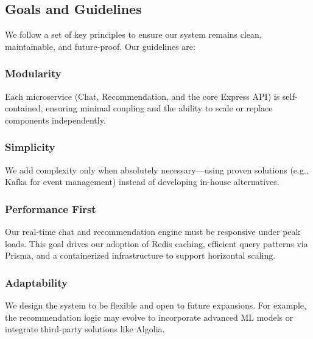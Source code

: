 \documentclass{FastFyp}
\begin{document}
\subsection{Goals and Guidelines}
We follow a set of key principles to ensure our system remains clean, maintainable, and future-proof. Our guidelines are:

\subsubsection{Modularity} 
Each microservice (Chat, Recommendation, and the core Express API) is self-contained, ensuring minimal coupling and the ability to scale or replace components independently.

   
\subsubsection{Simplicity}
We add complexity only when absolutely necessary—using proven solutions (e.g., Kafka for event management) instead of developing in-house alternatives.

 
\subsubsection{Performance First}
Our real-time chat and recommendation engine must be responsive under peak loads. This goal drives our adoption of Redis caching, efficient query patterns via Prisma, and a containerized infrastructure to support horizontal scaling.

\subsubsection{Adaptability}
We design the system to be flexible and open to future expansions. For example, the recommendation logic may evolve to incorporate advanced ML models or integrate third-party solutions like Algolia.
\end{document}
